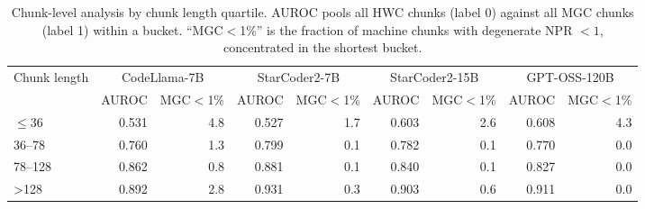 \begin{table}[t]
\centering
\caption{Chunk-level analysis by chunk length quartile. AUROC pools all HWC chunks (label 0) against all MGC chunks (label 1) within a bucket. ``MGC$<$1\%'' is the fraction of machine chunks with degenerate NPR $<1$, concentrated in the shortest bucket.}
\label{tab:chunk-by-length}
\begin{tabular}{lrrrrrrrr}
\toprule
Chunk length & \multicolumn{2}{c}{CodeLlama-7B} & \multicolumn{2}{c}{StarCoder2-7B} & \multicolumn{2}{c}{StarCoder2-15B} & \multicolumn{2}{c}{GPT-OSS-120B} \\
 & AUROC & MGC$<$1\% & AUROC & MGC$<$1\% & AUROC & MGC$<$1\% & AUROC & MGC$<$1\% \\
\midrule
$\leq$36 & 0.531 & 4.8 & 0.527 & 1.7 & 0.603 & 2.6 & 0.608 & 4.3 \\
36--78 & 0.760 & 1.3 & 0.799 & 0.1 & 0.782 & 0.1 & 0.770 & 0.0 \\
78--128 & 0.862 & 0.8 & 0.881 & 0.1 & 0.840 & 0.1 & 0.827 & 0.0 \\
>128 & 0.892 & 2.8 & 0.931 & 0.3 & 0.903 & 0.6 & 0.911 & 0.0 \\
\bottomrule
\end{tabular}
\end{table}
